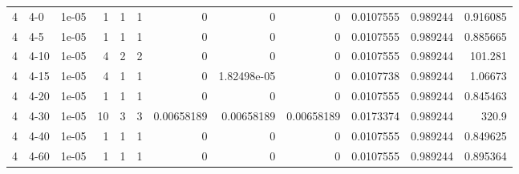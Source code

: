 \begin{tabular}{rlrrrrrrrrrr}
     4 & 4-0    &      1e-05 &           1 &                 1 &                 1 &     0           &     0           &      0           &        0.0107555 &               0.989244 &           0.916085 \\
     4 & 4-5    &      1e-05 &           1 &                 1 &                 1 &     0           &     0           &      0           &        0.0107555 &               0.989244 &           0.885665 \\
     4 & 4-10   &      1e-05 &           4 &                 2 &                 2 &     0           &     0           &      0           &        0.0107555 &               0.989244 &         101.281    \\
     4 & 4-15   &      1e-05 &           4 &                 1 &                 1 &     0           &     1.82498e-05 &      0           &        0.0107738 &               0.989244 &           1.06673  \\
     4 & 4-20   &      1e-05 &           1 &                 1 &                 1 &     0           &     0           &      0           &        0.0107555 &               0.989244 &           0.845463 \\
     4 & 4-30   &      1e-05 &          10 &                 3 &                 3 &     0.00658189  &     0.00658189  &      0.00658189  &        0.0173374 &               0.989244 &         320.9      \\
     4 & 4-40   &      1e-05 &           1 &                 1 &                 1 &     0           &     0           &      0           &        0.0107555 &               0.989244 &           0.849625 \\
     4 & 4-60   &      1e-05 &           1 &                 1 &                 1 &     0           &     0           &      0           &        0.0107555 &               0.989244 &           0.895364 \\
\hline
\end{tabular}
